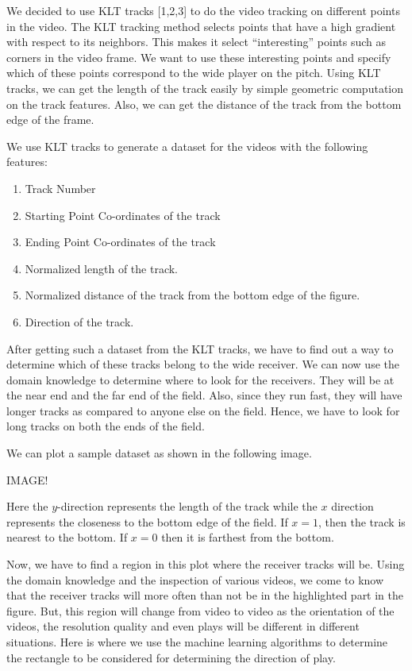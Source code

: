\documentclass{article} %
\begin{document}
We decided to use KLT tracks [1,2,3] to do the video tracking on different points in the video. The KLT tracking method selects points that have a high gradient with respect to its neighbors. This makes it select ``interesting'' points such as corners in the video frame. We want to use these interesting points and specify which of these points correspond to the wide player on the pitch. Using KLT tracks, we can get the length of the track easily by simple geometric computation on the track features. Also, we can get the distance of the track from the bottom edge of the frame.

We use KLT tracks to generate a dataset for the videos with the following features:

\begin{enumerate}
	\item Track Number
	\item Starting Point Co-ordinates of the track
	\item Ending Point Co-ordinates of the track
	\item Normalized length of the track.
	\item Normalized distance of the track from the bottom edge of the figure.
	\item Direction of the track.
\end{enumerate}

After getting such a dataset from the KLT tracks, we have to find out a way to determine which of these tracks belong to the wide receiver. We can now use the domain knowledge to determine where to look for the receivers. They will be at the near end and the far end of the field. Also, since they run fast, they will have longer tracks as compared to anyone else on the field. Hence, we have to look for long tracks on both the ends of the field.

We can plot a sample dataset as shown in the following image.

IMAGE!

Here the $y$-direction represents the length of the track while the $x$ direction represents the closeness to the bottom edge of the field. If $x = 1$, then the track is nearest to the bottom. If $x = 0$ then it is farthest from the bottom.

Now, we have to find a region in this plot where the receiver tracks will be. Using the domain knowledge and the inspection of various videos, we come to know that the receiver tracks will more often than not be in the highlighted part in the figure. But, this region will change from video to video as the orientation of the videos, the resolution quality and even plays will be different in different situations. Here is where we use the machine learning algorithms to determine the rectangle to be considered for determining the direction of play. 
\end{document}
